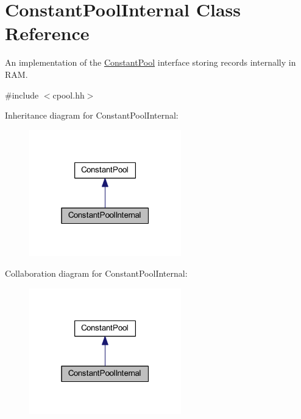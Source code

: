 \hypertarget{class_constant_pool_internal}{}\section{Constant\+Pool\+Internal Class Reference}
\label{class_constant_pool_internal}


An implementation of the \mbox{\hyperlink{class_constant_pool}{Constant\+Pool}} interface storing records internally in R\+AM.  




{\ttfamily \#include $<$cpool.\+hh$>$}



Inheritance diagram for Constant\+Pool\+Internal\+:
\nopagebreak
\begin{figure}[H]
\begin{center}
\leavevmode
\includegraphics[width=187pt]{class_constant_pool_internal__inherit__graph}
\end{center}
\end{figure}


Collaboration diagram for Constant\+Pool\+Internal\+:
\nopagebreak
\begin{figure}[H]
\begin{center}
\leavevmode
\includegraphics[width=187pt]{class_constant_pool_internal__coll__graph}
\end{center}
\end{figure}
